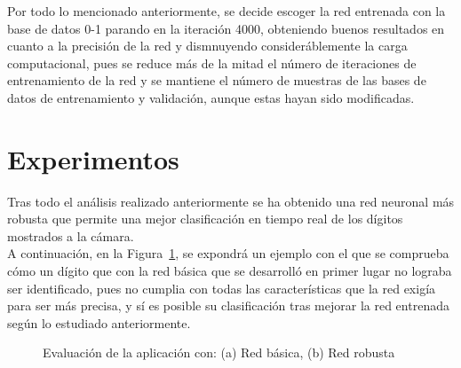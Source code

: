 Por todo lo mencionado anteriormente, se decide escoger la red entrenada con la base de datos 0-1 parando en la iteración 4000, obteniendo buenos resultados en cuanto a la precisión de la red y dismnuyendo consideráblemente la carga computacional, pues se reduce más de la mitad el número de iteraciones de entrenamiento de la red y se mantiene el número de muestras de las bases de datos de entrenamiento y validación, aunque estas hayan sido modificadas.

\section{Experimentos}

Tras todo el análisis realizado anteriormente se ha obtenido una red neuronal más robusta que permite una mejor clasificación en tiempo real de los dígitos mostrados a la cámara.\\

A continuación, en la Figura~\ref{fig.experimento}, se expondrá un ejemplo con el que se comprueba cómo un dígito que con la red básica que se desarrolló en primer lugar no lograba ser identificado, pues no cumplia con todas las características que la red exigía para ser más precisa, y sí es posible su clasificación tras mejorar la red entrenada según lo estudiado anteriormente. 

\begin{figure}[H]
	\centering
	\caption{Evaluación de la aplicación con: (a) Red básica, (b) Red robusta}
	\label{fig.experimento}
\end{figure}

